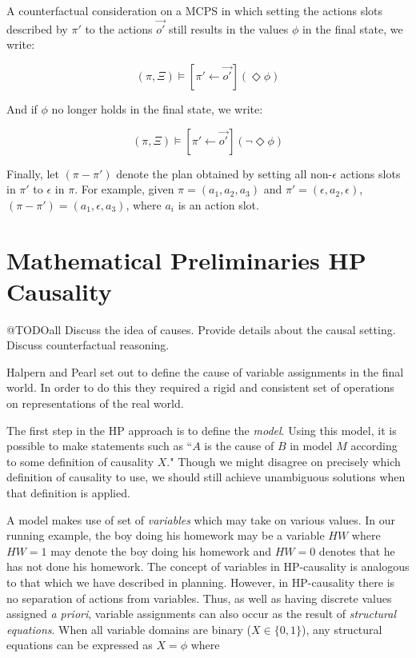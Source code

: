 \documentclass{article}
\theoremstyle{plain}
\theoremstyle{definition}
\begin{document}
A counterfactual consideration on a MCPS in which setting the actions slots described by $\pi'$ to the actions $\vec{o'}$ still results in the values $\phi$ in the final state, we write:

\[
(\pi, \Xi) \models [\pi' \leftarrow \vec{o'}](\Diamond \phi)
\]

And if $\phi$ no longer holds in the final state, we write:

\[
(\pi, \Xi) \models [\pi' \leftarrow \vec{o'}](\lnot \Diamond \phi)
\]

Finally, let $(\pi-\pi')$ denote the plan obtained by setting all non-$\epsilon$ actions slots in $\pi'$ to $\epsilon$ in $\pi$. For example, given $\pi=(a_1,a_2,a_3)$ and $\pi'=(\epsilon, a_2, \epsilon)$, $(\pi-\pi')=(a_1, \epsilon, a_3)$, where $a_i$ is an action slot.

\section{Mathematical Preliminaries HP Causality}

@TODOall  Discuss the idea of causes. Provide details about the causal setting. Discuss counterfactual reasoning.

Halpern and Pearl \cite{halpern2005causes} set out to define the cause of variable assignments in the final world. In order to do this they required a rigid and consistent set of operations on representations of the real world.

The first step in the HP approach is to define the \textit{model}. Using this model, it is possible to make statements such as ``$A$ is the cause of $B$ in  model $M$ according to some definition of causality $X$." Though we might disagree on precisely which definition of causality to use, we should still achieve unambiguous solutions when that definition is applied. 

A model makes use of set of \textit{variables} which may take on various values. In our running example, the boy doing his homework may be a variable $HW$ where $HW=1$ may denote the boy doing his homework and $HW=0$ denotes that he has not done his homework. The concept of variables in HP-causality is analogous to that which we have described in planning. However, in HP-causality there is no separation of actions from variables. Thus, as well as having discrete values assigned \textit{a priori}, variable assignments can also occur as the result of \textit{structural equations}. When all variable domains are binary ($X \in \{0,1\}$), any structural equations can be expressed as $X=\phi$ where
\end{document}
